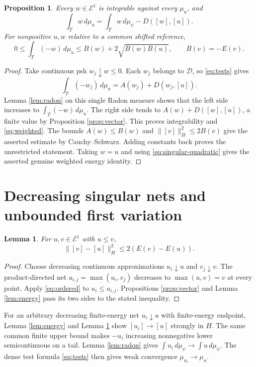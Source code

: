 \documentclass[11pt]{article}
\newtheorem{lemma}[theorem]{Lemma}
\newtheorem{proposition}[theorem]{Proposition}
\newcommand{\E}{\mathcal E}
\newcommand{\DF}{\mathcal D}
\begin{document}
\begin{proposition}\label{prop:weighted}
Every $w\in\E^1$ is integrable against every $\mu_u$, and
\begin{equation}\label{eq:weighted}
 \int_Tw\,d\mu_u=\int_Tw\,d\mu_\psi-D([w],[u]).
\end{equation}
For nonpositive $u,w$ relative to a common shifted reference,
\[
 0\leq\int_T(-w)\,d\mu_u
 \leq B(w)+2\sqrt{B(w)B(u)},\qquad B(v)=-E(v).
\]
\end{proposition}
\begin{proof}
Take continuous psh $w_j\downarrow w\leq0$. Each $w_j$ belongs
to $\DF$, so \eqref{eq:tests} gives
\[
 \int_T(-w_j)\,d\mu_u=A(w_j)+D(w_j,[u]).
\]
Lemma \ref{lem:radon} on this single Radon measure shows that
the left side increases to $\int_T(-w)\,d\mu_u$.
The right side tends to $A(w)+D([w],[u])$, a finite value by
Proposition \ref{prop:vector}. This proves integrability and
\eqref{eq:weighted}. The bounds $A(w)\leq B(w)$ and
$\|[v]\|_H^2\leq2B(v)$ give the asserted estimate by
Cauchy--Schwarz. Adding constants back proves the unrestricted
statement. Taking $w=u$ and using
\eqref{eq:singular-quadratic} gives the asserted genuine weighted
energy identity.
\end{proof}

\section{Decreasing singular nets and unbounded first variation}

\begin{lemma}\label{lem:ordered-singular}
For $u,v\in\E^1$ with $u\leq v$,
\[
 \|[v]-[u]\|_H^2\leq2(E(v)-E(u)).
\]
\end{lemma}
\begin{proof}
Choose decreasing continuous approximations $u_i\downarrow u$ and
$v_j\downarrow v$. The product-directed net
$a_{i,j}=\max(u_i,v_j)$ decreases to $\max(u,v)=v$ at every point.
Apply \eqref{eq:ordered} to $u_i\leq a_{i,j}$.
Propositions \ref{prop:vector} and Lemma \ref{lem:energy} pass
its two sides to the stated inequality.
\end{proof}

For an arbitrary decreasing finite-energy net $u_i\downarrow u$
with finite-energy endpoint, Lemma \ref{lem:energy} and
Lemma \ref{lem:ordered-singular} show $[u_i]\to[u]$ strongly in
$H$. The same common finite upper bound makes $-u_i$ increasing
nonnegative lower semicontinuous on a tail. Lemma \ref{lem:radon}
gives $\int u_i\,d\mu_\psi\to\int u\,d\mu_\psi$.
The dense test formula \eqref{eq:tests} then gives weak convergence
$\mu_{u_i}\to\mu_u$.
\end{document}
